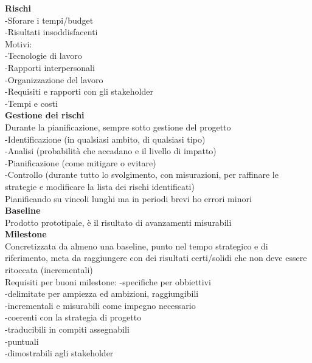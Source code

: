 \documentclass{article}
\begin{document}
			\textbf{Rischi}\\
			-Sforare i tempi/budget\\
			-Risultati insoddisfacenti\\
			Motivi:\\
			-Tecnologie di lavoro\\
			-Rapporti interpersonali\\
			-Organizzazione del lavoro\\
			-Requisiti e rapporti con gli stakeholder\\
			-Tempi e costi\\
		
			\textbf{Gestione dei rischi}\\
			Durante la pianificazione, sempre sotto gestione del progetto\\
			-Identificazione (in qualsiasi ambito, di qualsiasi tipo)\\
			-Analisi (probabilità che accadano e il livello di impatto)\\
			-Pianificazione (come mitigare o evitare)\\
			-Controllo (durante tutto lo svolgimento, con misurazioni, per raffinare le strategie e modificare la lista dei rischi identificati)\\
			Pianificando su vincoli lunghi ma in periodi brevi ho errori minori\\
			
			\textbf{Baseline}\\
			Prodotto prototipale, è il risultato di avanzamenti misurabili\\
			
			\textbf{Milestone}\\
			Concretizzata da almeno una baseline, punto nel tempo strategico e di riferimento, meta da raggiungere con dei risultati certi/solidi che non deve essere ritoccata (incrementali)\\
			Requisiti per buoni milestone:
			-specifiche per obbiettivi\\
			-delimitate per ampiezza ed ambizioni, raggiungibili\\
			-incrementali e misurabili come impegno necessario\\
			-coerenti con la strategia di progetto\\
			-traducibili in compiti assegnabili\\
			-puntuali\\
			-dimostrabili agli stakeholder\\
			
\end{document}
